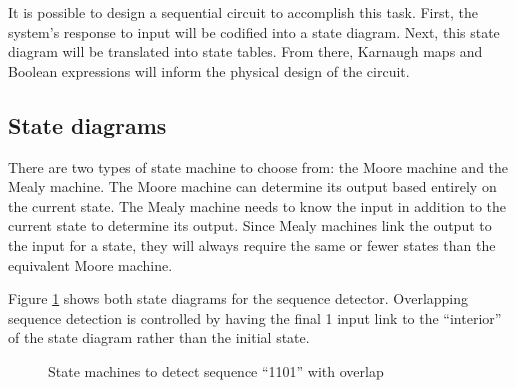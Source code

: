 \documentclass[11pt]{article}
\begin{document}
It is possible to design a sequential circuit to accomplish this task. First, the system's response to input will be codified into a state diagram. Next, this state diagram will be translated into state tables. From there, Karnaugh maps and Boolean expressions will inform the physical design of the circuit.

\subsection{State diagrams}
There are two types of state machine to choose from: the Moore machine and the Mealy machine. The Moore machine can determine its output based entirely on the current state. The Mealy machine needs to know the input in addition to the current state to determine its output. Since Mealy machines link the output to the input for a state, they will always require the same or fewer states than the equivalent Moore machine.

Figure \ref{fig:state_machines} shows both state diagrams for the sequence detector. Overlapping sequence detection is controlled by having the final 1 input link to the ``interior'' of the state diagram rather than the initial state.

\begin{figure}[htpb]
	\centering
	\caption{State machines to detect sequence ``1101'' with overlap}
	\label{fig:state_machines}
\end{figure}
\end{document}
